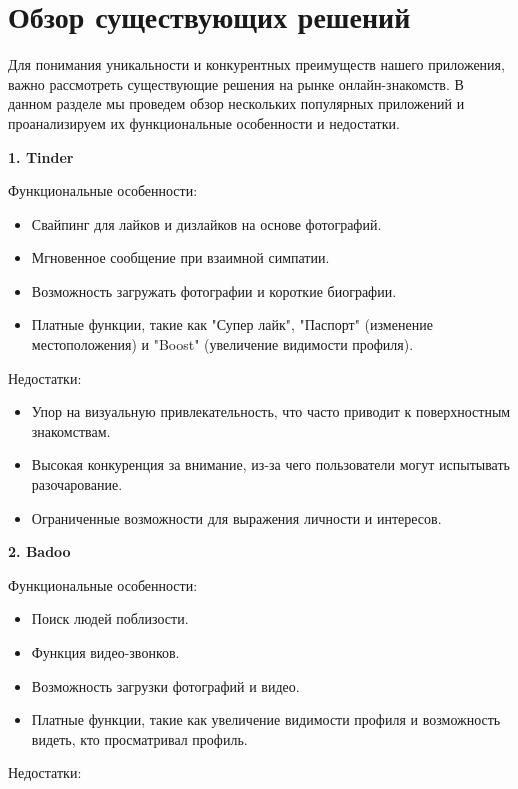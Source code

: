 \section{Обзор существующих решений}

Для понимания уникальности и конкурентных преимуществ нашего приложения, важно рассмотреть существующие решения на рынке онлайн-знакомств. В данном разделе мы проведем обзор нескольких популярных приложений и проанализируем их функциональные особенности и недостатки.

\textbf{1. Tinder}

Функциональные особенности:

\begin{itemize}
    \item Свайпинг для лайков и дизлайков на основе фотографий.
    \item Мгновенное сообщение при взаимной симпатии.
    \item Возможность загружать фотографии и короткие биографии.
    \item Платные функции, такие как "Супер лайк", "Паспорт" (изменение местоположения) и "Boost" (увеличение видимости профиля).
\end{itemize}

Недостатки:

\begin{itemize}
    \item Упор на визуальную привлекательность, что часто приводит к поверхностным знакомствам.
    \item Высокая конкуренция за внимание, из-за чего пользователи могут испытывать разочарование.
    \item Ограниченные возможности для выражения личности и интересов.
\end{itemize}

\textbf{2. Badoo}

Функциональные особенности:

\begin{itemize}
    \item Поиск людей поблизости.
    \item Функция видео-звонков.
    \item Возможность загрузки фотографий и видео.
    \item Платные функции, такие как увеличение видимости профиля и возможность видеть, кто просматривал профиль.
\end{itemize}

Недостатки:

